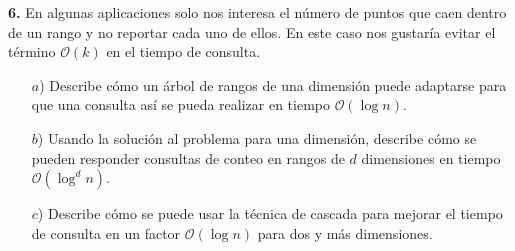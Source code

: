 \textbf{6.} En algunas aplicaciones solo nos interesa el número de puntos que caen dentro de
un rango y no reportar cada uno de ellos. En este caso nos gustaría evitar el término
$\mathcal{O}(k)$ en el tiempo de consulta.
\begin{enumerate}
\item[$a$)] Describe cómo un árbol de rangos de una dimensión puede adaptarse para que
una consulta así se pueda realizar en tiempo $\mathcal{O}(\log n)$.
\item[$b$)] Usando la solución al problema para una dimensión, describe cómo se pueden
responder consultas de conteo en rangos de $d$ dimensiones en tiempo $\mathcal{O}(\log^d n)$.
\item[$c$)] Describe cómo se puede usar la técnica de cascada para mejorar el tiempo de
consulta en un factor $\mathcal{O}(\log n)$ para dos y más dimensiones.
\end{enumerate}

